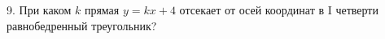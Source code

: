9. При каком $k$ прямая $y=kx+4$ отсекает от осей координат в I четверти равнобедренный треугольник?\\
